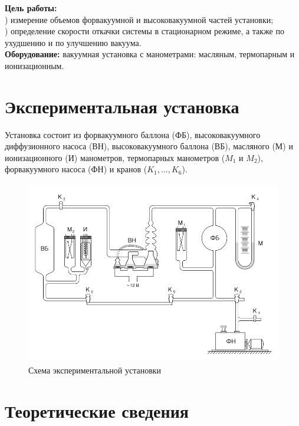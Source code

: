 \textbf{Цель работы:} \\) измерение объемов форвакуумной и высоковакуумной частей установки;\\) определение скорости откачки системы в стационарном режиме, а также 
по ухудшению и по улучшению вакуума. \\\indent
\textbf{Оборудование:} вакуумная установка с манометрами: масляным, 
термопарным и ионизационным. \\ 
\section*{Экспериментальная установка}

Установка состоит из форвакуумного баллона (ФБ), высоковакуумного диффузионного
насоса (ВН), высоковакуумного баллона (ВБ), масляного (М) и ионизационного (И) манометров,
термопарных манометров ($M_1$ и $M_2$), форвакуумного насоса (ФН) и кранов 
($K_1, \dots, K_6$).

\begin{figure}[h!]
    \centering
    \includegraphics[height=8cm]{setup.png}
    \caption{Схема экспериментальной установки}
\end{figure}

\newpage

\section*{Теоретические сведения}

